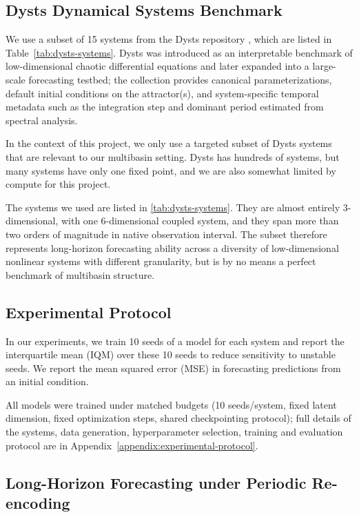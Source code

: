 \subsection{Dysts Dynamical Systems Benchmark}

We use a subset of 15 systems from the Dysts repository \citep{gilpin_chaos_2021, gilpin_model_2023}, which are listed in Table~\ref{tab:dysts-systems}. Dysts was introduced as an interpretable benchmark of low-dimensional chaotic differential equations and later expanded into a large-scale forecasting testbed; the collection provides canonical parameterizations, default initial conditions on the attractor(s), and system-specific temporal metadata such as the integration step and dominant period estimated from spectral analysis. 

In the context of this project, we only use a targeted subset of Dysts systems that are relevant to our multibasin setting. Dysts has hundreds of systems, but many systems have only one fixed point, and we are also somewhat limited by compute for this project.

The systems we used are listed in \cref{tab:dysts-systems}. They are almost entirely 3-dimensional, with one 6-dimensional coupled system, and they span more than two orders of magnitude in native observation interval. The subset therefore represents long-horizon forecasting ability across a diversity of low-dimensional nonlinear systems with different granularity, but is by no means a perfect benchmark of multibasin structure. 


\subsection{Experimental Protocol}
In our experiments, we train 10 seeds of a model for each system and report the interquartile mean (IQM) over these 10 seeds to reduce sensitivity to unstable seeds. We report the mean squared error (MSE) in forecasting predictions from an initial condition.

All models were trained under matched budgets (10 seeds/system, fixed latent dimension, fixed optimization steps, shared checkpointing protocol); full details of the systems, data generation, hyperparameter selection, training and evaluation protocol are in Appendix~\ref{appendix:experimental-protocol}.

\subsection{Long-Horizon Forecasting under Periodic Re-encoding}

